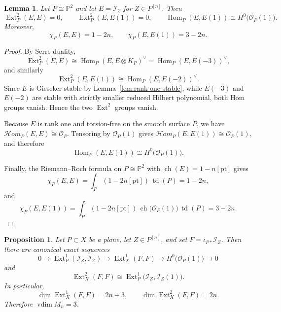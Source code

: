 \documentclass[12pt]{amsart}
\numberwithin{equation}{section}
\newcommand{\PP}{\mathbb{P}}
\newcommand{\OO}{\mathcal{O}}
\newcommand{\I}{\mathcal{I}}
\newcommand{\ch}{\operatorname{ch}}
\newcommand{\Ext}{\operatorname{Ext}}
\newcommand{\Hom}{\operatorname{Hom}}
\newcommand{\td}{\operatorname{td}}
\newcommand{\vdim}{\operatorname{vdim}}
\newcommand{\dual}{\vee}
\theoremstyle{plain}
\newtheorem{proposition}[theorem]{Proposition}
\newtheorem{lemma}[theorem]{Lemma}
\theoremstyle{definition}
\theoremstyle{remark}
\begin{document}
\begin{lemma}\label{lem:surface-ext-vanishing}
Let $P\cong \PP^2$ and let $E=\I_Z$ for $Z\in P^{[n]}$.
Then
\[
\Ext^2_P(E,E)=0,
\qquad
\Ext^2_P(E,E(1))=0,
\qquad
\Hom_P(E,E(1))\cong H^0\bigl(\OO_P(1)\bigr).
\]
Moreover,
\[
\chi_P(E,E)=1-2n,
\qquad
\chi_P(E,E(1))=3-2n.
\]
\end{lemma}

\begin{proof}
By Serre duality,
\[
\Ext^2_P(E,E)\cong \Hom_P(E,E\otimes K_P)^\dual=\Hom_P(E,E(-3))^\dual,
\]
and similarly
\[
\Ext^2_P(E,E(1))\cong \Hom_P(E,E(-2))^\dual.
\]
Since $E$ is Gieseker stable by Lemma~\ref{lem:rank-one-stable}, while $E(-3)$ and $E(-2)$ are stable with strictly smaller reduced Hilbert polynomial, both Hom groups vanish.
Hence the two $\Ext^2$ groups vanish.

Because $E$ is rank one and torsion-free on the smooth surface $P$, we have $\mathcal Hom_P(E,E)\cong \OO_P$.
Tensoring by $\OO_P(1)$ gives $\mathcal Hom_P(E,E(1))\cong \OO_P(1)$, and therefore
\[
\Hom_P(E,E(1))\cong H^0\bigl(\OO_P(1)\bigr).
\]

Finally, the Riemann--Roch formula on $P\cong \PP^2$ with $\ch(E)=1-n[\mathrm{pt}]$ gives
\[
\chi_P(E,E)=\int_P (1-2n[\mathrm{pt}])\,\td(P)=1-2n,
\]
and
\[
\chi_P(E,E(1))=\int_P (1-2n[\mathrm{pt}])\,\ch\bigl(\OO_P(1)\bigr)\,\td(P)=3-2n.
\]
\end{proof}

\begin{proposition}\label{prop:tangent-obstruction-fiber}
Let $P\subset X$ be a plane, let $Z\in P^{[n]}$, and set $F=\iota_{P*}\I_Z$.
Then there are canonical exact sequences
\begin{equation}\label{eq:tangent-exact-fiber}
0\longrightarrow \Ext^1_P(\I_Z,\I_Z)
\longrightarrow \Ext^1_X(F,F)
\longrightarrow H^0\bigl(\OO_P(1)\bigr)
\longrightarrow 0
\end{equation}
and
\begin{equation}\label{eq:obstruction-fiber}
\Ext^2_X(F,F)\cong \Ext^1_P\bigl(\I_Z,\I_Z(1)\bigr).
\end{equation}
In particular,
\[
\dim \Ext^1_X(F,F)=2n+3,
\qquad
\dim \Ext^2_X(F,F)=2n.
\]
Therefore $\vdim M_n=3$.
\end{proposition}
\end{document}
